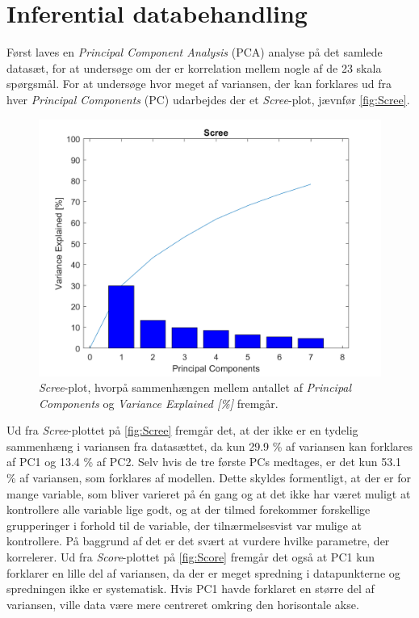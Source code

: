 \section{Inferential databehandling}
\label{sec:inferentiel}
%
Først laves en \textit{Principal Component Analysis} (PCA) analyse på det samlede datasæt, for at undersøge om der er korrelation mellem nogle af de 23 skala spørgsmål. For at undersøge hvor meget af variansen, der kan forklares ud fra hver \textit{Principal Components} (PC) udarbejdes der et \textit{Scree}-plot, jævnfør \autoref{fig:Scree}. 
%
\begin{figure}[H]
\centering
\includegraphics[width=\textwidth]{Figure/DatabehandlingSkalaer/PCAfigures/Scree.png}
\caption{\textit{Scree}-plot, hvorpå sammenhængen mellem antallet af \textit{Principal Components} og \textit{Variance Explained [\%]} fremgår.}
\label{fig:Scree}
\end{figure}
\noindent
%
Ud fra \textit{Scree}-plottet på \autoref{fig:Scree} fremgår det, at der ikke er en tydelig sammenhæng i variansen fra datasættet, da kun 29.9 \% af variansen kan forklares af PC1 og 13.4 \% af PC2. Selv hvis de tre første PCs medtages, er det kun 53.1 \% af variansen, som forklares af modellen. Dette skyldes formentligt, at der er for mange variable, som bliver varieret på én gang og at det ikke har været muligt at kontrollere alle variable lige godt, og at der tilmed forekommer forskellige grupperinger i forhold til de variable, der tilnærmelsesvist var mulige at kontrollere. På baggrund af det er det svært at vurdere hvilke parametre, der korrelerer.\blankline 
%
Ud fra \textit{Score}-plottet på \autoref{fig:Score} fremgår det også at PC1 kun forklarer en lille del af variansen, da der er meget spredning i datapunkterne og spredningen ikke er systematisk. Hvis PC1 havde forklaret en større del af variansen, ville data være mere centreret omkring den horisontale akse.
